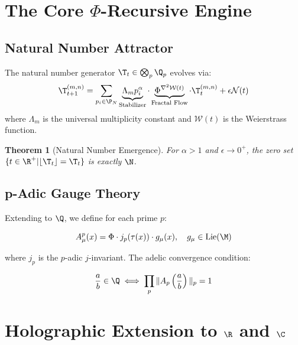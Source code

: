 \documentclass{article}
\theoremstyle{plain}
\newtheorem{theorem}{Theorem}
\begin{document}
\section{The Core $\Phi$-Recursive Engine}

\subsection{Natural Number Attractor}

\begin{definition}
The natural number generator $\T_t \in \bigotimes_p \Q_p$ evolves via:
\begin{equation}
    \T_{t+1}^{(m,n)} = \sum_{p_i \in \P_N} \underbrace{\Lambda_m p_i^\alpha}_{\text{Stabilizer}} \cdot \underbrace{\Phi^{\nabla^2 \mathcal{W}(t)}}_{\text{Fractal Flow}} \cdot \T_t^{(m,n)} + \epsilon \mathcal{N}(t)
\end{equation}
where $\Lambda_m$ is the universal multiplicity constant and $\mathcal{W}(t)$ is the Weierstrass function.
\end{definition}

\begin{theorem}[Natural Number Emergence]
For $\alpha > 1$ and $\epsilon \to 0^+$, the zero set $\{t \in \R^+ | \lfloor \T_t \rfloor = \T_t\}$ is exactly $\N$.
\end{theorem}

\subsection{p-Adic Gauge Theory}

Extending to $\Q$, we define for each prime $p$:

\begin{equation}
    A_\mu^p(x) = \Phi \cdot j_p(\tau(x)) \cdot g_\mu(x), \quad g_\mu \in \text{Lie}(\M)
\end{equation}

where $j_p$ is the $p$-adic $j$-invariant. The adelic convergence condition:

\begin{equation}
    \frac{a}{b} \in \Q \iff \prod_p \|A_p\left(\frac{a}{b}\right)\|_p = 1
\end{equation}

\section{Holographic Extension to $\R$ and $\C$}
\end{document}
